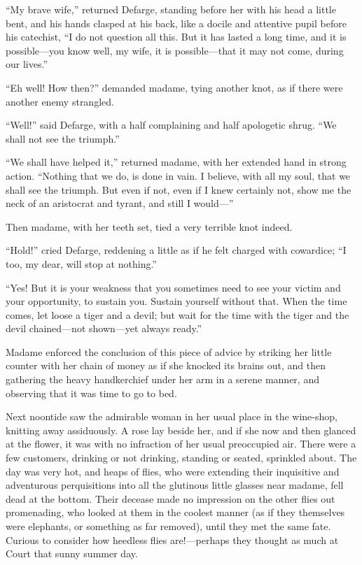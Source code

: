 ``My brave wife,'' returned Defarge, standing before her with his head
a little bent, and his hands clasped at his back, like a docile and
attentive pupil before his catechist, ``I do not question all this.
But it has lasted a long time, and it is possible---you know well,
my wife, it is possible---that it may not come, during our lives.''

``Eh well!  How then?'' demanded madame, tying another knot, as if
there were another enemy strangled.

``Well!'' said Defarge, with a half complaining and half apologetic shrug.
``We shall not see the triumph.''

``We shall have helped it,'' returned madame, with her extended hand in
strong action.  ``Nothing that we do, is done in vain.  I believe, with
all my soul, that we shall see the triumph.  But even if not, even if
I knew certainly not, show me the neck of an aristocrat and tyrant,
and still I would---''

Then madame, with her teeth set, tied a very terrible knot indeed.

``Hold!'' cried Defarge, reddening a little as if he felt charged with
cowardice; ``I too, my dear, will stop at nothing.''

``Yes!  But it is your weakness that you sometimes need to see your
victim and your opportunity, to sustain you.  Sustain yourself without
that.  When the time comes, let loose a tiger and a devil; but wait
for the time with the tiger and the devil chained---not shown---yet
always ready.''

Madame enforced the conclusion of this piece of advice by striking
her little counter with her chain of money as if she knocked its brains
out, and then gathering the heavy handkerchief under her arm in a
serene manner, and observing that it was time to go to bed.

Next noontide saw the admirable woman in her usual place in the
wine-shop, knitting away assiduously.  A rose lay beside her, and
if she now and then glanced at the flower, it was with no infraction
of her usual preoccupied air.  There were a few customers, drinking
or not drinking, standing or seated, sprinkled about.  The day was
very hot, and heaps of flies, who were extending their inquisitive
and adventurous perquisitions into all the glutinous little glasses
near madame, fell dead at the bottom.  Their decease made no impression
on the other flies out promenading, who looked at them in the coolest
manner (as if they themselves were elephants, or something as far
removed), until they met the same fate.  Curious to consider how heedless
flies are!---perhaps they thought as much at Court that sunny summer day.

